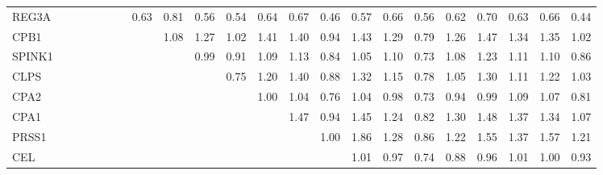 \begin{longtable}{lrrrrrrrrrrrrrrrrrrrrr}
REG3A    &              &              &              &             &             &             &       0.63 &         0.81 &       0.56 &       0.54 &       0.64 &        0.67 &      0.46 &        0.57 &           0.66 &      0.56 &          0.62 &      0.70 &        0.63 &        0.66 &       0.44 \\
CPB1     &              &              &              &             &             &             &            &         1.08 &       1.27 &       1.02 &       1.41 &        1.40 &      0.94 &        1.43 &           1.29 &      0.79 &          1.26 &      1.47 &        1.34 &        1.35 &       1.02 \\
SPINK1   &              &              &              &             &             &             &            &              &       0.99 &       0.91 &       1.09 &        1.13 &      0.84 &        1.05 &           1.10 &      0.73 &          1.08 &      1.23 &        1.11 &        1.10 &       0.86 \\
CLPS     &              &              &              &             &             &             &            &              &            &       0.75 &       1.20 &        1.40 &      0.88 &        1.32 &           1.15 &      0.78 &          1.05 &      1.30 &        1.11 &        1.22 &       1.03 \\
CPA2     &              &              &              &             &             &             &            &              &            &            &       1.00 &        1.04 &      0.76 &        1.04 &           0.98 &      0.73 &          0.94 &      0.99 &        1.09 &        1.07 &       0.81 \\
CPA1     &              &              &              &             &             &             &            &              &            &            &            &        1.47 &      0.94 &        1.45 &           1.24 &      0.82 &          1.30 &      1.48 &        1.37 &        1.34 &       1.07 \\
PRSS1    &              &              &              &             &             &             &            &              &            &            &            &             &      1.00 &        1.86 &           1.28 &      0.86 &          1.22 &      1.55 &        1.37 &        1.57 &       1.21 \\
CEL      &              &              &              &             &             &             &            &              &            &            &            &             &           &        1.01 &           0.97 &      0.74 &          0.88 &      0.96 &        1.01 &        1.00 &       0.93 \\

\end{longtable}
